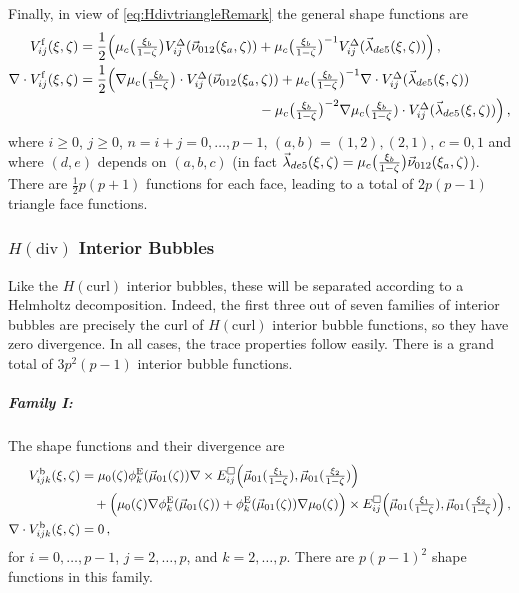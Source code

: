 Finally, in view of \eqref{eq:HdivtriangleRemark} the general shape functions are 
\begin{equation}
	\begin{aligned}
		V_{ij}^\mathrm{f}(\xi,\zeta)&=\frac{1}{2}\Big(\mu_c\big(\textstyle{\frac{\xi_b}{1-\zeta}}\big)V_{ij}^\Delta(\vec{\nu}_{012}(\xi_a,\zeta))
			+\mu_c\big(\textstyle{\frac{\xi_b}{1-\zeta}}\big)^{-1}V_{ij}^\Delta(\vec{\lambda}_{de5}(\xi,\zeta))\Big)\,,\\
    \nabla\cdot V_{ij}^\mathrm{f}(\xi,\zeta)&=\frac{1}{2}\Big(\nabla\mu_c\big(\textstyle{\frac{\xi_b}{1-\zeta}}\big)\cdot V_{ij}^\Delta(\vec{\nu}_{012}(\xi_a,\zeta))
    	+\mu_c\big(\textstyle{\frac{\xi_b}{1-\zeta}}\big)^{-1}\nabla\cdot V_{ij}^\Delta(\vec{\lambda}_{de5}(\xi,\zeta))\\
    		&\qquad\qquad\qquad\qquad\qquad\qquad\quad
    			-\mu_c\big(\textstyle{\frac{\xi_b}{1-\zeta}}\big)^{-2}\nabla\mu_c(\textstyle{\frac{\xi_b}{1-\zeta}})\cdot V_{ij}^\Delta(\vec{\lambda}_{de5}(\xi,\zeta))\Big)\,,	
	\end{aligned}
	\label{eq:PyrHdivTriaFace}
\end{equation}
where $i\geq0$, $j\geq0$, $n=i+j=0,\ldots,p-1$, $(a,b)=(1,2),(2,1)$, $c=0,1$ and where $(d,e)$ depends on $(a,b,c)$ (in fact $\vec{\lambda}_{de5}(\xi,\zeta)=\mu_c\big(\textstyle{\frac{\xi_b}{1-\zeta}}\big)\vec{\nu}_{012}(\xi_a,\zeta)$).
There are $\frac{1}{2}p(p+1)$ functions for each face, leading to a total of $2p(p-1)$ triangle face functions.

\subsubsection{\texorpdfstring{$H(\mathrm{div})$}{Hdiv} Interior Bubbles}

Like the $H(\mathrm{curl})$ interior bubbles, these will be separated according to a Helmholtz decomposition.
Indeed, the first three out of seven families of interior bubbles are precisely the curl of $H(\mathrm{curl})$ interior bubble functions, so they have zero divergence.
In all cases, the trace properties follow easily.
There is a grand total of $3p^2(p-1)$ interior bubble functions.

\subparagraph{Family I:}
The shape functions and their divergence are
\begin{equation}
	\begin{aligned}
		V_{ijk}^{\mathrm{b}}(\xi,\zeta)&=\mu_0(\zeta)\phi_k^{\mathrm{E}}(\vec{\mu}_{01}(\zeta))\nabla\times
			E_{ij}^\square\Big(\vec{\mu}_{01}(\textstyle{\frac{\xi_1}{1-\zeta}}),\vec{\mu}_{01}(\textstyle{\frac{\xi_2}{1-\zeta}})\Big)\\
				&\quad+\Big(\mu_0(\zeta)\nabla\phi_k^{\mathrm{E}}(\vec{\mu}_{01}(\zeta))+\phi_k^{\mathrm{E}}(\vec{\mu}_{01}(\zeta))\nabla\mu_0(\zeta)\Big)
					\times E_{ij}^\square\Big(\vec{\mu}_{01}(\textstyle{\frac{\xi_1}{1-\zeta}}),\vec{\mu}_{01}(\textstyle{\frac{\xi_2}{1-\zeta}})\Big)\,,\\
		\nabla\cdot V_{ijk}^{\mathrm{b}}(\xi,\zeta)&=0\,,
	\end{aligned}
	\label{eq:PyrHdivInteriorI}
\end{equation}
for $i=0,\ldots,p-1$, $j=2,\ldots,p$, and $k=2,\ldots,p$.
There are $p(p-1)^2$ shape functions in this family.

